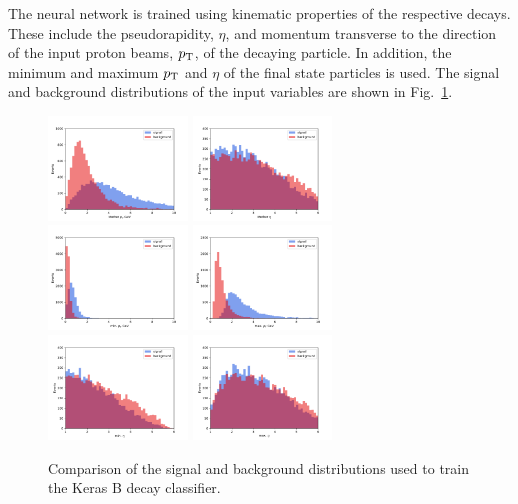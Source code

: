 \documentclass[final,5p,times,twocolumn]{elsarticle}
\def\pt         {\mbox{$p_{\rm T}$}\xspace}
\begin{document}
The neural network is trained using kinematic properties of the respective decays.
These include the pseudorapidity, $\eta$, and momentum transverse to the direction of the
input proton beams, \pt, of the decaying particle. In addition, the minimum and maximum \pt and $\eta$
of the final state particles is used. The signal and background distributions of the input variables
are shown in Fig.~\ref{fig:inputs}.
%
\begin{figure}[t]
\centering
\includegraphics[width=0.33\textwidth]{pt_comp}
\includegraphics[width=0.33\textwidth]{eta_comp}
\includegraphics[width=0.33\textwidth]{minpt_comp}
\includegraphics[width=0.33\textwidth]{maxpt_comp}
\includegraphics[width=0.33\textwidth]{mineta_comp}
\includegraphics[width=0.33\textwidth]{maxeta_comp}
\caption{\small Comparison of the signal and background distributions
used to train the Keras B decay classifier.}
\label{fig:inputs}
\end{figure}
\end{document}
